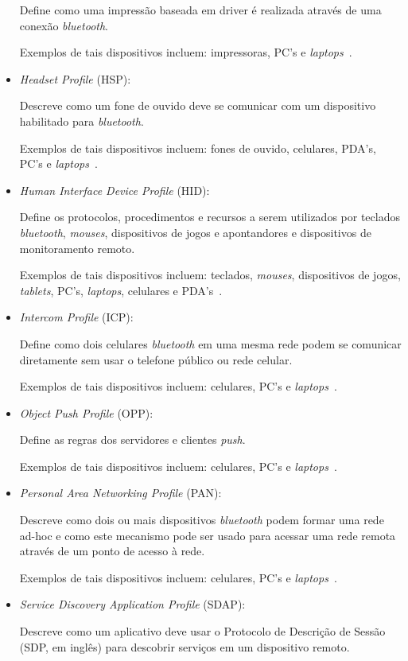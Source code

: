 \begin{itemize}
	Define como uma impressão baseada em driver é realizada através de uma conexão \emph{bluetooth}.

	Exemplos de tais dispositivos incluem: impressoras, PC's e \emph{laptops}~\cite{bluetoothprofilesHCRP}.
	\item \emph{Headset Profile} (HSP): 

	Descreve como um fone de ouvido deve se comunicar com um dispositivo habilitado para \emph{bluetooth}.

	Exemplos de tais dispositivos incluem: fones de ouvido, celulares, PDA's, PC's e \emph{laptops}~\cite{bluetoothprofilesHSP}.
	\item \emph{Human Interface Device Profile} (HID): 

	Define os protocolos, procedimentos e recursos a serem utilizados por teclados \emph{bluetooth}, \emph{mouses}, dispositivos de jogos e apontandores e dispositivos de monitoramento remoto.

	Exemplos de tais dispositivos incluem: teclados, \emph{mouses}, dispositivos de jogos, \emph{tablets}, PC's, \emph{laptops}, celulares e PDA's~\cite{bluetoothprofilesHID}.
	\item \emph{Intercom Profile} (ICP): 

	Define como dois celulares \emph{bluetooth} em uma mesma rede podem se comunicar diretamente sem usar o telefone público ou rede celular.

	Exemplos de tais dispositivos incluem: celulares, PC's e \emph{laptops}~\cite{bluetoothprofilesICP}.
	\item \emph{Object Push Profile} (OPP): 

	Define as regras dos servidores e clientes \emph{push}.

	Exemplos de tais dispositivos incluem: celulares, PC's e \emph{laptops}~\cite{bluetoothprofilesOPP}.
	\item \emph{Personal Area Networking Profile} (PAN): 

	Descreve como dois ou mais dispositivos \emph{bluetooth} podem formar uma rede ad-hoc e como este mecanismo pode ser usado para acessar uma rede remota através de um ponto de acesso à rede.

	Exemplos de tais dispositivos incluem: celulares, PC's e \emph{laptops}~\cite{bluetoothprofilesPAN}.
	\item \emph{Service Discovery Application Profile} (SDAP): 

	Descreve como um aplicativo deve usar o Protocolo de Descrição de Sessão (SDP, em inglês) para descobrir serviços em um dispositivo remoto.


\end{itemize}
